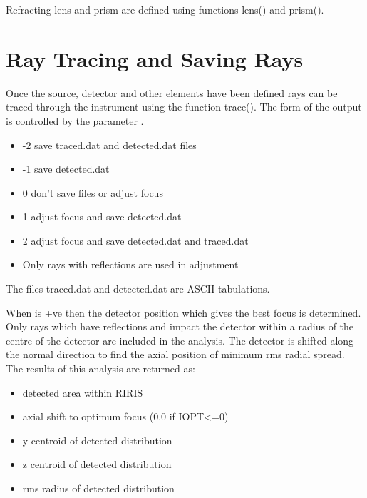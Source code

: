 \documentclass[letterpaper,10pt,english]{sphinxmanual}
\begin{document}

Refracting lens and prism are defined using functions lens() and prism().


\section{Ray Tracing and Saving Rays}
\label{\detokenize{xsrt_tracing:ray-tracing-and-saving-rays}}\label{\detokenize{xsrt_tracing::doc}}
Once the source, detector and other elements have been defined rays can be
traced through the instrument using the function trace(). The form of the
output is controlled by the parameter .
\begin{itemize}
\item {} 
-2 save traced.dat and detected.dat files

\item {} 
-1 save detected.dat

\item {} 
0 don’t save files or adjust focus

\item {} 
1 adjust focus and save detected.dat

\item {} 
2 adjust focus and save detected.dat and traced.dat

\item {} 
Only rays with  reflections are used in adjustment

\end{itemize}

The files traced.dat and detected.dat are ASCII tabulations.

When  is +ve then the detector position which gives the best focus is
determined. Only rays which have  reflections and impact the detector
within a radius  of the centre of the detector are included in the
analysis. The detector is shifted along the normal direction to find
the axial position of minimum rms radial spread. The results of this
analysis are returned as:
\begin{itemize}
\item {} 
    detected area within RIRIS

\item {} 
   axial shift to optimum focus (0.0 if IOPT\textless{}=0)

\item {} 
    y centroid of detected distribution

\item {} 
    z centroid of detected distribution

\item {} 
     rms radius of detected distribution

\end{itemize}
\end{document}
